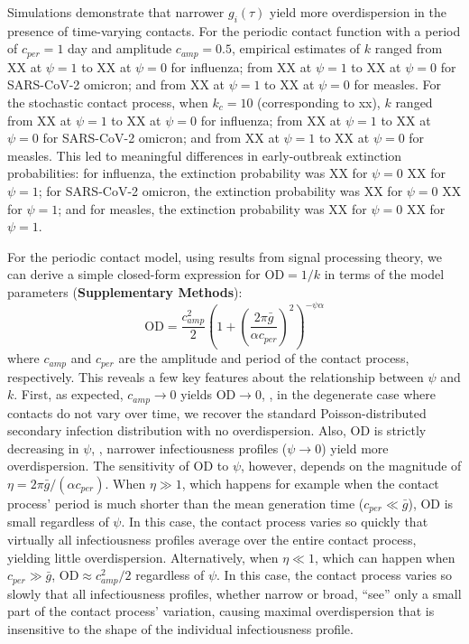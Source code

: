 Simulations demonstrate that narrower $g_i(\tau)$ yield more overdispersion in the presence of time-varying contacts. For the periodic contact function with a period of $c_{per} = 1$ day and amplitude $c_{amp} = 0.5$, empirical estimates of $k$ ranged from XX at $\psi = 1$ to XX at $\psi = 0$ for influenza; from XX at $\psi = 1$ to XX at $\psi = 0$ for SARS-CoV-2 omicron; and from XX at $\psi = 1$ to XX at $\psi = 0$ for measles. For the stochastic contact process, when $k_c = 10$ (corresponding to xx), $k$ ranged from XX at $\psi = 1$ to XX at $\psi = 0$ for influenza; from XX at $\psi = 1$ to XX at $\psi = 0$ for SARS-CoV-2 omicron; and from XX at $\psi = 1$ to XX at $\psi = 0$ for measles. This led to meaningful differences in early-outbreak extinction probabilities: for influenza, the extinction probability was XX for $\psi = 0$ \vs XX for $\psi = 1$; for SARS-CoV-2 omicron, the extinction probability was XX for $\psi = 0$ \vs XX for $\psi = 1$; and for measles, the extinction probability was XX for $\psi = 0$ \vs XX for $\psi = 1$. 

For the periodic contact model, using results from signal processing theory, we can derive a simple closed-form expression for $\text{OD} = 1/k$ in terms of the model parameters ({\bf Supplementary Methods}): 
\begin{equation}
\text{OD} = \frac{c_{amp}^2}{2} \left(    1 + \left(    \frac{2 \pi \bar{g}}{\alpha c_{per}} \right)^2 \right)^{-\psi \alpha}
\label{eq:OD}
\end{equation}
where $c_{amp}$ and $c_{per}$ are the amplitude and period of the contact process, respectively. This reveals a few key features about the relationship between $\psi$ and $k$. First, as expected, $c_{amp} \rightarrow 0$ yields $\text{OD} \rightarrow 0$, \ie, in the degenerate case where contacts do not vary over time, we recover the standard Poisson-distributed secondary infection distribution with no overdispersion. Also, $\text{OD}$ is strictly decreasing in $\psi$, \ie, narrower infectiousness profiles ($\psi \rightarrow 0$) yield more overdispersion. The sensitivity of $\text{OD}$ to $\psi$, however, depends on the magnitude of $\eta = 2 \pi \bar{g} / (\alpha c_{per})$. When $\eta \gg 1$, which happens for example when the contact process' period is much shorter than the mean generation time ($c_{per} \ll \bar{g}$), $\text{OD}$ is small regardless of $\psi$. In this case, the contact process varies so quickly that virtually all infectiousness profiles average over the entire contact process, yielding little overdispersion. Alternatively, when $\eta \ll 1$, which can happen when $c_{per} \gg \bar{g}$, $\text{OD} \approx c_{amp}^2 / 2$ regardless of $\psi$. In this case, the contact process varies so slowly that all infectiousness profiles, whether narrow or broad, ``see'' only a small part of the contact process' variation, causing maximal overdispersion that is insensitive to the shape of the individual infectiousness profile. 

